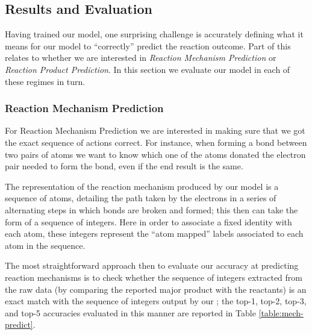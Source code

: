 
\subsection{Results and Evaluation}

Having trained our model, one surprising challenge is accurately defining what it means for our model to ``correctly'' predict the reaction outcome. 
Part of this relates to whether we are interested in  \emph{Reaction Mechanism Prediction} or \emph{Reaction Product Prediction}.  
In this section we evaluate our model in each of these regimes in turn.

\subsubsection{Reaction Mechanism Prediction}

 For Reaction Mechanism Prediction we are interested in making sure that we got the exact sequence of actions correct.
For instance, when forming a bond between two pairs of atoms we want to know which one of the atoms donated the electron pair needed to form the bond, even if the end result is the same. 

The representation of the reaction mechanism produced by our model is a sequence of atoms, detailing the path taken by the electrons in a series of alternating steps in which bonds are broken and formed; this then can take the form of a sequence of integers.
Here in order to associate a fixed identity with each atom, these integers represent the ``atom mapped'' labels associated to each atom in the sequence.

The most straightforward approach then to evaluate our accuracy at predicting reaction mechanisms is to check whether the sequence of integers extracted from the raw data (by comparing the reported major product with the reactants) is an exact match with the sequence of integers output by our \ourModel; the top-1, top-2, top-3, and top-5 accuracies evaluated in this manner are reported in Table \ref{table:mech-predict}.

